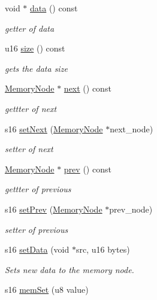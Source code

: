 \begin{DoxyCompactItemize}
void $\ast$ \hyperlink{class_memory_node_a5f375b561aea9c23dd04c133d2ed9add}{data} () const
\begin{DoxyCompactList}\small\item\em getter of data \end{DoxyCompactList}\item 
u16 \hyperlink{class_memory_node_a2cce3c72a53570de651f43a9b8d0d023}{size} () const
\begin{DoxyCompactList}\small\item\em gets the data size \end{DoxyCompactList}\item 
\hyperlink{class_memory_node}{Memory\+Node} $\ast$ \hyperlink{class_memory_node_a6f704b211e3638e78677cc5010f73724}{next} () const
\begin{DoxyCompactList}\small\item\em gettter of next \end{DoxyCompactList}\item 
s16 \hyperlink{class_memory_node_ae5535f4947d24e5855aba8f9b2355c36}{set\+Next} (\hyperlink{class_memory_node}{Memory\+Node} $\ast$next\+\_\+node)
\begin{DoxyCompactList}\small\item\em setter of next \end{DoxyCompactList}\item 
\hyperlink{class_memory_node}{Memory\+Node} $\ast$ \hyperlink{class_memory_node_a4fe6fb65838319101cde35a371728bb5}{prev} () const
\begin{DoxyCompactList}\small\item\em gettter of previous \end{DoxyCompactList}\item 
s16 \hyperlink{class_memory_node_a3370c238a8a995f0cd34a84c2180c654}{set\+Prev} (\hyperlink{class_memory_node}{Memory\+Node} $\ast$prev\+\_\+node)
\begin{DoxyCompactList}\small\item\em setter of previous \end{DoxyCompactList}\item 
s16 \hyperlink{class_memory_node_af4631d27eef2e810df9767b66f46e26b}{set\+Data} (void $\ast$src, u16 bytes)
\begin{DoxyCompactList}\small\item\em Sets new data to the memory node. \end{DoxyCompactList}\item 
s16 \hyperlink{class_memory_node_a0d366149c6c235c72016ba5bf2b7fe3c}{mem\+Set} (u8 value)

\end{DoxyCompactItemize}
